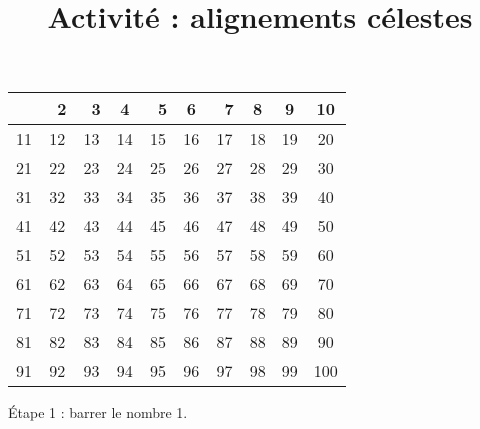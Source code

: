 \documentclass[a4paper]{beamer}
\title{Activité : alignements célestes}
\date{}
\author{}
\begin{document}
\renewcommand{\arraystretch}{1.4}

\begin{frame}
	\begin{center}
		\begin{tabular}{|c|c|c|c|c|c|c|c|c|c|}
			\hline
			\xcancel{1} & \ 2 & \ 3 & 4  & \ 5 & 6  & \ 7 & 8  & 9  & 10  \\ \hline
			11          & 12  & 13  & 14 & 15  & 16 & 17  & 18 & 19 & 20  \\ \hline
			21          & 22  & 23  & 24 & 25  & 26 & 27  & 28 & 29 & 30  \\ \hline
			31          & 32  & 33  & 34 & 35  & 36 & 37  & 38 & 39 & 40  \\ \hline
			41          & 42  & 43  & 44 & 45  & 46 & 47  & 48 & 49 & 50  \\ \hline
			51          & 52  & 53  & 54 & 55  & 56 & 57  & 58 & 59 & 60  \\ \hline
			61          & 62  & 63  & 64 & 65  & 66 & 67  & 68 & 69 & 70  \\ \hline
			71          & 72  & 73  & 74 & 75  & 76 & 77  & 78 & 79 & 80  \\ \hline
			81          & 82  & 83  & 84 & 85  & 86 & 87  & 88 & 89 & 90  \\ \hline
			91          & 92  & 93  & 94 & 95  & 96 & 97  & 98 & 99 & 100 \\ \hline
		\end{tabular}

		Étape 1 : barrer le nombre 1.
	\end{center}
\end{frame}
\end{document}
